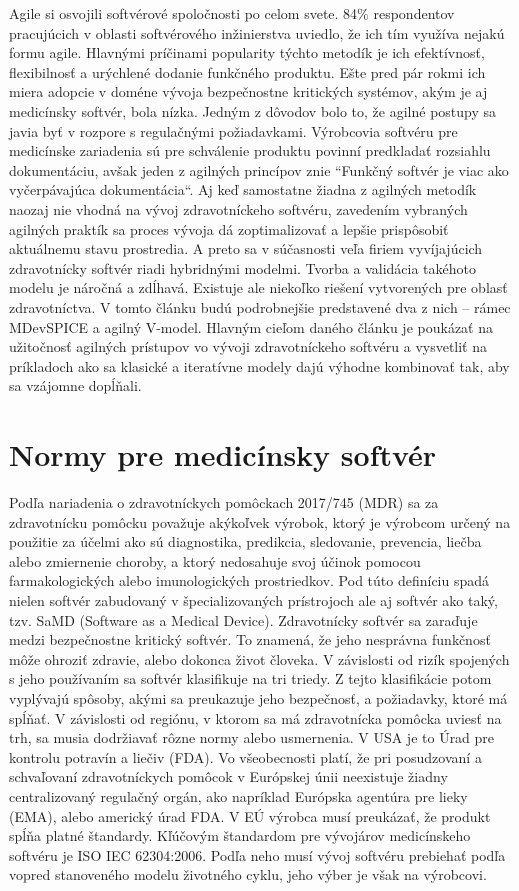 \documentclass[10pt,twoside,slovak,a4paper]{article}
\begin{document}
Agile si osvojili softvérové spoločnosti po celom svete. 84\% respondentov pracujúcich v oblasti softvérového inžinierstva uviedlo, že ich tím využíva nejakú formu agile. Hlavnými príčinami popularity týchto metodík je ich efektívnosť, flexibilnosť a urýchlené dodanie funkčného produktu\cite{agileReport}. Ešte pred pár rokmi ich miera adopcie v doméne vývoja bezpečnostne kritických systémov, akým je aj medicínsky softvér, bola nízka. Jedným z dôvodov bolo to, že agilné postupy sa javia byť v rozpore s regulačnými požiadavkami. Výrobcovia softvéru pre medicínske zariadenia sú pre schválenie produktu povinní predkladať rozsiahlu dokumentáciu, avšak jeden z agilných princípov znie “Funkčný softvér je viac ako vyčerpávajúca dokumentácia“\cite{mchugh2013}. Aj keď samostatne žiadna z agilných metodík naozaj nie vhodná na vývoj zdravotníckeho softvéru, zavedením vybraných agilných praktík sa proces vývoja dá zoptimalizovať a lepšie prispôsobiť aktuálnemu stavu prostredia\cite{mccaffery2019}. A preto sa v súčasnosti veľa firiem vyvíjajúcich zdravotnícky softvér riadi hybridnými modelmi\cite{hybridReport}. Tvorba a validácia takéhoto modelu je náročná a zdĺhavá. Existuje ale niekoľko riešení vytvorených pre oblasť zdravotníctva. V tomto článku budú podrobnejšie predstavené dva z nich – rámec MDevSPICE a agilný V-model. Hlavným cieľom daného článku je poukázať na užitočnosť agilných prístupov vo vývoji zdravotníckeho softvéru a vysvetliť na príkladoch ako sa klasické a iteratívne modely dajú výhodne kombinovať tak, aby sa vzájomne dopĺňali. 


\section{Normy pre medicínsky softvér}
Podľa nariadenia o zdravotníckych pomôckach 2017/745 (MDR) sa za zdravotnícku pomôcku považuje akýkoľvek výrobok, ktorý je výrobcom určený na použitie za účelmi ako sú diagnostika, predikcia, sledovanie, prevencia, liečba alebo zmiernenie choroby, a ktorý nedosahuje svoj účinok pomocou farmakologických alebo imunologických prostriedkov. Pod túto definíciu spadá nielen softvér zabudovaný v špecializovaných prístrojoch ale aj softvér ako taký, tzv. SaMD (Software as a Medical Device). Zdravotnícky softvér sa zaraďuje medzi bezpečnostne kritický softvér. To znamená, že jeho nesprávna funkčnosť môže ohroziť zdravie, alebo dokonca život človeka. V závislosti od rizík spojených s jeho používaním sa softvér klasifikuje na tri triedy. Z tejto klasifikácie potom vyplývajú spôsoby, akými sa preukazuje jeho bezpečnosť, a požiadavky, ktoré má spĺňať. V závislosti od regiónu, v ktorom sa má zdravotnícka pomôcka uviesť na trh, sa musia dodržiavať rôzne normy alebo usmernenia. V USA je to Úrad pre kontrolu potravín a liečiv (FDA). Vo všeobecnosti platí, že pri posudzovaní a schvaľovaní zdravotníckych pomôcok v Európskej únii neexistuje žiadny centralizovaný regulačný orgán, ako napríklad Európska agentúra pre lieky (EMA), alebo americký úrad FDA. V EÚ výrobca musí preukázať, že produkt spĺňa platné štandardy. Kľúčovým štandardom pre vývojárov medicínskeho softvéru je ISO IEC 62304:2006. Podľa neho musí vývoj softvéru prebiehať podľa vopred stanoveného modelu životného cyklu, jeho výber je však na výrobcovi\cite{bronneke2021}.
\end{document}
